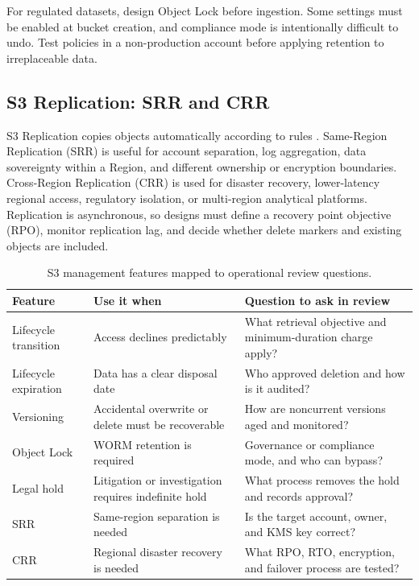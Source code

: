 \begin{tipbox}
For regulated datasets, design Object Lock before ingestion. Some settings must be enabled at bucket creation, and compliance mode is intentionally difficult to undo. Test policies in a non-production account before applying retention to irreplaceable data.
\end{tipbox}

\subsection{S3 Replication: SRR and CRR}
S3 Replication copies objects automatically according to rules \cite{awsS3Replication}. Same-Region Replication (SRR) is useful for account separation, log aggregation, data sovereignty within a Region, and different ownership or encryption boundaries. Cross-Region Replication (CRR) is used for disaster recovery, lower-latency regional access, regulatory isolation, or multi-region analytical platforms. Replication is asynchronous, so designs must define a recovery point objective (RPO), monitor replication lag, and decide whether delete markers and existing objects are included.

\begin{table}[H]
\centering
\small
\begin{tabular}{@{}p{3.0cm}p{4.7cm}p{5.6cm}@{}}
\toprule
\textbf{Feature} & \textbf{Use it when} & \textbf{Question to ask in review} \\
\midrule
Lifecycle transition & Access declines predictably & What retrieval objective and minimum-duration charge apply? \\
Lifecycle expiration & Data has a clear disposal date & Who approved deletion and how is it audited? \\
Versioning & Accidental overwrite or delete must be recoverable & How are noncurrent versions aged and monitored? \\
Object Lock & WORM retention is required & Governance or compliance mode, and who can bypass? \\
Legal hold & Litigation or investigation requires indefinite hold & What process removes the hold and records approval? \\
SRR & Same-region separation is needed & Is the target account, owner, and KMS key correct? \\
CRR & Regional disaster recovery is needed & What RPO, RTO, encryption, and failover process are tested? \\
\bottomrule
\end{tabular}
\caption{S3 management features mapped to operational review questions.}
\label{tab:s3-management-features}
\end{table}

